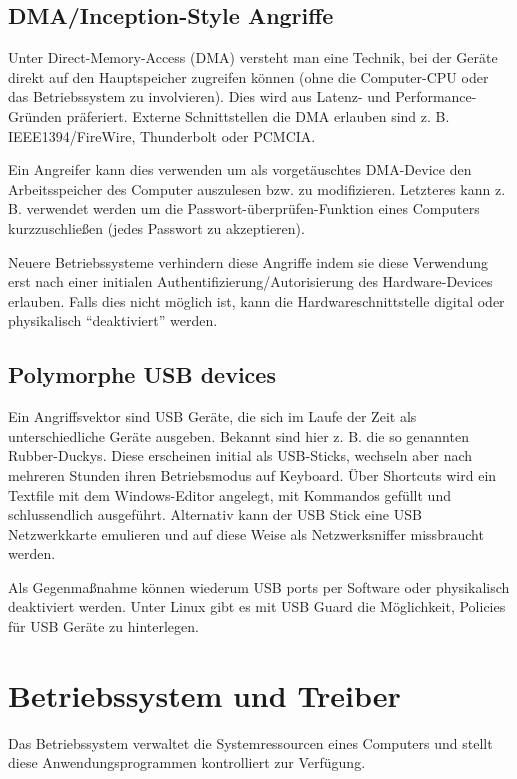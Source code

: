 \section{DMA/Inception-Style Angriffe}

Unter Direct-Memory-Access (DMA) versteht man eine Technik, bei der Geräte direkt auf den Hauptspeicher zugreifen können (ohne die Computer-CPU oder das Betriebssystem zu involvieren). Dies wird aus Latenz- und Performance-Gründen präferiert. Externe Schnittstellen die DMA erlauben sind z. B. IEEE1394/FireWire, Thunderbolt oder PCMCIA.

Ein Angreifer kann dies verwenden um als vorgetäuschtes DMA-Device den Arbeitsspeicher des Computer auszulesen bzw. zu modifizieren. Letzteres kann z. B. verwendet werden um die Passwort-überprüfen-Funktion eines Computers kurzzuschließen (jedes Passwort zu akzeptieren).

Neuere Betriebssysteme verhindern diese Angriffe indem sie diese Verwendung erst nach einer initialen Authentifizierung/Autorisierung des Hardware-Devices erlauben. Falls dies nicht möglich ist, kann die Hardwareschnittstelle digital oder physikalisch ``deaktiviert'' werden.

\section{Polymorphe USB devices}

Ein Angriffsvektor sind USB Geräte, die sich im Laufe der Zeit als unterschiedliche Geräte ausgeben. Bekannt sind hier z. B. die so genannten Rubber-Duckys. Diese erscheinen initial als USB-Sticks, wechseln aber nach mehreren Stunden ihren Betriebsmodus auf Keyboard. Über Shortcuts wird ein Textfile mit dem Windows-Editor angelegt, mit Kommandos gefüllt und schlussendlich ausgeführt. Alternativ kann der USB Stick eine USB Netzwerkkarte emulieren und auf diese Weise als Netzwerksniffer missbraucht werden.

Als Gegenmaßnahme können wiederum USB ports per Software oder physikalisch deaktiviert werden. Unter Linux gibt es mit USB Guard die Möglichkeit, Policies für USB Geräte zu hinterlegen.

\chapter{Betriebssystem und Treiber}

Das Betriebssystem verwaltet die Systemressourcen eines Computers und stellt diese Anwendungsprogrammen kontrolliert zur Verfügung.


